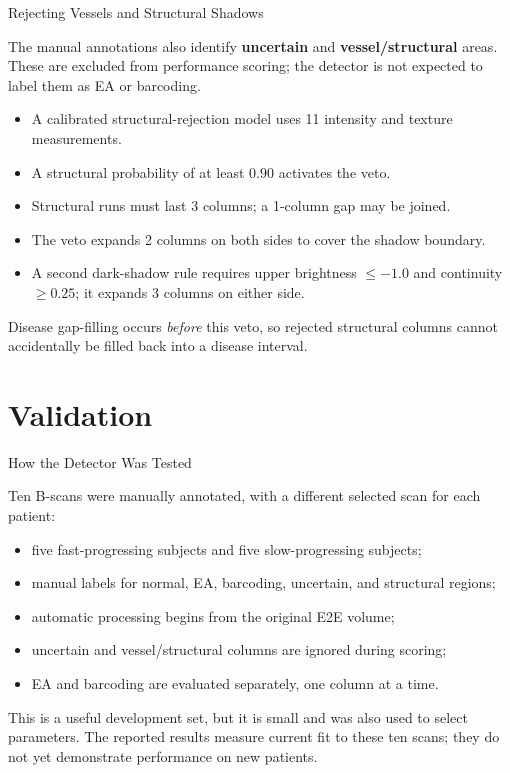 \documentclass[aspectratio=169]{beamer}
\begin{document}
\begin{frame}{Rejecting Vessels and Structural Shadows}

The manual annotations also identify \textbf{uncertain} and
\textbf{vessel/structural} areas. These are excluded from performance scoring;
the detector is not expected to label them as EA or barcoding.

\begin{itemize}
    \item A calibrated structural-rejection model uses 11 intensity and texture
    measurements.
    \item A structural probability of at least $0.90$ activates the veto.
    \item Structural runs must last 3 columns; a 1-column gap may be joined.
    \item The veto expands 2 columns on both sides to cover the shadow boundary.
    \item A second dark-shadow rule requires upper brightness $\leq-1.0$ and
    continuity $\geq0.25$; it expands 3 columns on either side.
\end{itemize}

Disease gap-filling occurs \emph{before} this veto, so rejected structural
columns cannot accidentally be filled back into a disease interval.

\end{frame}

\section{Validation}

\begin{frame}{How the Detector Was Tested}

Ten B-scans were manually annotated, with a different selected scan for each
patient:

\begin{itemize}
    \item five fast-progressing subjects and five slow-progressing subjects;
    \item manual labels for normal, EA, barcoding, uncertain, and structural
    regions;
    \item automatic processing begins from the original E2E volume;
    \item uncertain and vessel/structural columns are ignored during scoring;
    \item EA and barcoding are evaluated separately, one column at a time.
\end{itemize}

\vspace{0.25cm}

This is a useful development set, but it is small and was also used to select
parameters. The reported results measure current fit to these ten scans; they
do not yet demonstrate performance on new patients.

\end{frame}
\end{document}
